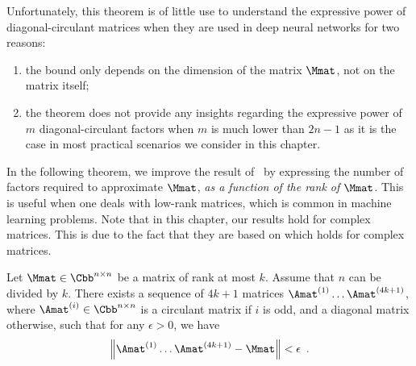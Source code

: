 



Unfortunately, this theorem is of little use to understand the expressive power of diagonal-circulant matrices when they are used in deep neural networks for two reasons:
\begin{enumerate}%
  \item the bound only depends on the dimension of the matrix $\Mmat$, not on the matrix itself;
  \item the theorem does not provide any insights regarding the expressive power of $m$ diagonal-circulant factors when $m$ is much lower than $2n - 1$ as it is the case in most practical scenarios we consider in this chapter. 
\end{enumerate}

In the following theorem, we improve the result of~\citet{huhtanen2015factoring} by expressing the number of factors required to approximate $\Mmat$, \emph{as a function of the rank of $\Mmat$}.
This is useful when one deals with low-rank matrices, which is common in machine learning problems. 
Note that in this chapter, our results hold for complex matrices.
This is due to the fact that they are based on  which holds for complex matrices.

\begin{maintheorem} \label{theorem:ch4-rank-decomposition}
  Let $\Mmat \in \Cbb^{n \times n}$ be a matrix of rank at most $k$.
  Assume that $n$ can be divided by $k$.
  There exists a sequence of $4k+1$ matrices $\Amat^{(1)} \ldots \Amat^{(4k+1)}$, where $\Amat^{(i)} \in \Cbb^{n \times n}$ is a circulant matrix if $i$ is odd, and a diagonal matrix otherwise, such that for any $\epsilon > 0$, we have
  \begin{equation}
    \norm{\Amat^{(1)} \ldots \Amat^{(4k+1)} - \Mmat} < \epsilon \enspace.
  \end{equation}
  \removespace
\end{maintheorem}

